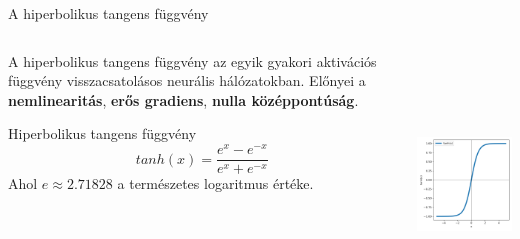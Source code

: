 \documentclass[english, aspectratio=169]{beamer}
\begin{document}
\begin{frame}{A hiperbolikus tangens függvény}
\begin{columns}
\begin{column}{.5\textwidth}
A hiperbolikus tangens függvény az egyik gyakori aktivációs függvény visszacsatolásos neurális hálózatokban. Előnyei a \textbf{nemlinearitás}, \textbf{erős gradiens}, \textbf{nulla középpontúság}. 
\begin{block}{Hiperbolikus tangens függvény}
\[
tanh(x) = \frac{e^x - e^{-x}}{e^x + e^{-x}}
\]
Ahol $e \approx 2.71828$ a természetes logaritmus értéke. 
\end{block}
\end{column}
\begin{column}{.5\textwidth}
\begin{center}
\includegraphics[height=7cm, width=7cm, keepaspectratio]{images/tanh.png}
\end{center}
\end{column}
\end{columns}
\end{frame}
\end{document}
